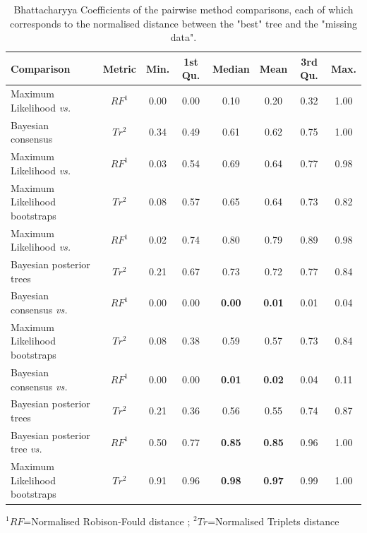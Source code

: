 \documentclass[12pt,letterpaper]{article}
\begin{document}

\begin{table}[ht]
\caption{Bhattacharyya Coefficients of the pairwise method comparisons, each of which corresponds to the normalised distance between the "best" tree and the "missing data".}
\centering
\begin{tabular}{lccccccc}
  \hline
 Comparison &  Metric & Min. & 1st Qu. & Median & Mean & 3rd Qu. & Max. \\ 
  \hline
    Maximum Likelihood \textit{vs.} & $RF^1$ & 0.00 & 0.00 & 0.10 & 0.20 & 0.32 & 1.00 \\ 
    Bayesian consensus              & $Tr^2$ & 0.34 & 0.49 & 0.61 & 0.62 & 0.75 & 1.00 \\ 
    Maximum Likelihood \textit{vs.} & $RF^1$ & 0.03 & 0.54 & 0.69 & 0.64 & 0.77 & 0.98 \\ 
    Maximum Likelihood bootstraps   & $Tr^2$ & 0.08 & 0.57 & 0.65 & 0.64 & 0.73 & 0.82 \\ 
    Maximum Likelihood \textit{vs.} & $RF^1$ & 0.02 & 0.74 & 0.80 & 0.79 & 0.89 & 0.98 \\ 
    Bayesian posterior trees        & $Tr^2$ & 0.21 & 0.67 & 0.73 & 0.72 & 0.77 & 0.84 \\ 
    Bayesian consensus \textit{vs.} & $RF^1$ & 0.00 & 0.00 & \textbf{0.00} & \textbf{0.01} & 0.01 & 0.04 \\ 
    Maximum Likelihood bootstraps   & $Tr^2$ & 0.08 & 0.38 & 0.59 & 0.57 & 0.73 & 0.84 \\ 
    Bayesian consensus \textit{vs.} & $RF^1$ & 0.00 & 0.00 & \textbf{0.01} & \textbf{0.02} & 0.04 & 0.11 \\ 
    Bayesian posterior trees        & $Tr^2$ & 0.21 & 0.36 & 0.56 & 0.55 & 0.74 & 0.87 \\ 
    Bayesian posterior tree \textit{vs.}  & $RF^1$ & 0.50 & 0.77 & \textbf{0.85} & \textbf{0.85} & 0.96 & 1.00 \\ 
    Maximum Likelihood bootstraps   & $Tr^2$ & 0.91 & 0.96 & \textbf{0.98} & \textbf{0.97} & 0.99 & 1.00 \\ 
   \hline
\end{tabular}
   $^1RF$=Normalised Robison-Fould distance ; $^2Tr$=Normalised Triplets distance
\label{Tab_Results-Difference_methods}
\end{table}
\end{document}
